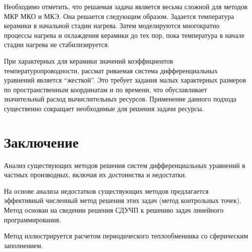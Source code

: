 \documentclass[a4paper,11pt,numreferences,mathsec,kaplist]{isuepsutf8}
\begin{document}
\begin{article}
Необходимо отметить, что решаемая задача является весьма сложной для
методов МКР МКО и МКЭ. Она решается следующим образом. Задается
температура керамики в начальной стадии нагрева. Затем моделируются
многократно процессы нагрева и охлаждения керамики до тех пор, пока
температура в начале стадии нагрева не стабилизируется. 

При характерных для керамики значений коэффициентов
температуропроводности, рассмат риваемая система дифференциальных
уравнений является “жесткой”. Это требует задания малых характерных
размеров по пространственным координатам и по времени, что
обуславливает значительный расход вычислительных ресурсов. Применение
данного подхода существенно сокращает необходимые для решения задачи
ресурсы. 

\section{Заключение}

Анализ существующих методов решения систем дифференциальных уравнений
в частных производных, включая их достоинства и недостатки.

На основе анализа недостатков существующих методов предлагается
эффективный численный метод решения этих задач (метод контрольных
точек). Метод основан на сведении решения СДУЧП к решению задач
линейного программирования.

Метод иллюстрируется расчетом периодического теплообменника со
сферическим заполнением.





\end{article}
\end{document}
